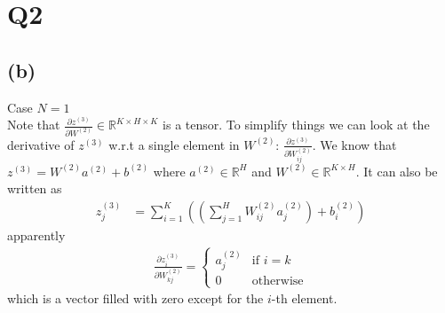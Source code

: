 \documentclass{article}
\newcommand{\bb}{b^{(2)}}
\newcommand{\ab}{a^{(2)}}
\newcommand{\zc}{z^{(3)}}
\newcommand{\Wb}{W^{(2)}}
\begin{document}
\section*{Q2}
\subsection*{(b)}
Case $N = 1$\\
Note that $\frac{\partial \zc}{\partial \Wb} \in \mathbb{R}^{K\times H\times K}$ is a tensor.
To simplify things we can look at the derivative of $\zc$ w.r.t a single element in $\Wb$: 
$\frac{\partial \zc}{\partial \Wb_{ij}}$.
We know that $\zc = \Wb\ab + \bb$ where $\ab \in \mathbb{R}^{H}$ and $\Wb \in \mathbb{R}^{K\times H}$.
It can also be written as
\begin{align*}
    \zc_j &= \sum_{i=1}^{K}\left(\left(\sum_{j=1}^{H} \Wb_{ij} \ab_j\right) + \bb_i\right)
\end{align*}
apparently
\begin{align*}
    \frac{\partial \zc_i}{\partial \Wb_{kj}} =
    \begin{cases}
        \ab_j & \text{if } i = k\\
        0 & \text{otherwise}
    \end{cases}
\end{align*}
which is a vector filled with zero except for the $i$-th element.
\end{document}

